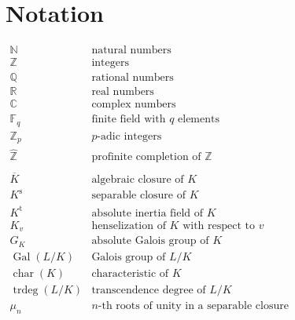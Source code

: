 \section{Notation}

$\begin{array}{ll}
\mathbb{N} & \text{natural numbers} \\
\mathbb{Z} & \text{integers}\\
\mathbb{Q} & \text{rational numbers}\\
\mathbb{R} & \text{real numbers}\\
\mathbb{C} & \text{complex numbers}\\
\mathbb{F}_q & \text{finite field with $q$ elements}\\
\mathbb{Z}_p & \text{$p$-adic integers}\\
\hat{\mathbb{Z}} & \text{profinite completion of $\mathbb{Z}$}\\
\\
\overline{K} & \text{algebraic closure of $K$}\\
K^\text{s} & \text{separable closure of $K$}\\
K^\text{t} & \text{absolute inertia field of $K$}\\
K_v & \text{henselization of $K$ with respect to $v$}\\
G_K & \text{absolute Galois group of $K$}\\
\operatorname{Gal}(L/K) & \text{Galois group of $L/K$}\\
\operatorname{char}(K) & \text{characteristic of $K$}\\
\operatorname{trdeg}(L/K) & \text{transcendence degree of $L/K$}\\
\mu_n & \text{$n$-th roots of unity in a separable closure}
\end{array}$